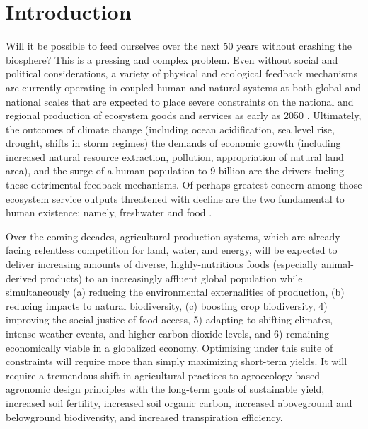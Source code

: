 
\section{Introduction}
Will it be possible to feed ourselves over the next 50 years without crashing the biosphere? This is a pressing and complex problem. Even without social and political considerations, a variety of physical and ecological feedback mechanisms are currently operating in coupled human and natural systems at both global and national scales that are expected to place severe constraints on the national and regional production of ecosystem goods and services as early as 2050 \citep{zhao_drought-induced_2010, hoegh-guldberg_impact_2010, eigenbrod_impact_2011}. Ultimately, the outcomes of climate change (including ocean acidification, sea level rise, drought, shifts in storm regimes) the demands of economic growth (including increased natural resource extraction, pollution, appropriation of natural land area), and the surge of a human population to 9 billion are the drivers fueling these detrimental feedback mechanisms. Of perhaps greatest concern among those ecosystem service outputs threatened with decline are the two fundamental to human existence; namely, freshwater and food \citep{dodds_human_2013, rogers_facing_2008, lobell_climate_2011, wada_global_2010, zhao_drought-induced_2010, schmidhuber_global_2007, tilman_forecasting_2001, tilman_agricultural_2002}. 

Over the coming decades, agricultural production systems, which are already facing relentless competition for land, water, and energy, will be expected to deliver increasing amounts of diverse, highly-nutritious foods (especially animal-derived products) to an increasingly affluent global population while simultaneously (a) reducing the environmental externalities of production, (b) reducing impacts to natural biodiversity, (c) boosting crop biodiversity, 4) improving the social justice of food access, 5) adapting to shifting climates, intense weather events, and higher carbon dioxide levels, and 6) remaining economically viable in a globalized economy. Optimizing under this suite of constraints will require more than simply maximizing short-term yields. It will require a tremendous shift in agricultural practices to agroecology-based agronomic design principles with the long-term goals of sustainable yield, increased soil fertility, increased soil organic carbon, increased aboveground and belowground biodiversity, and increased transpiration efficiency. 

